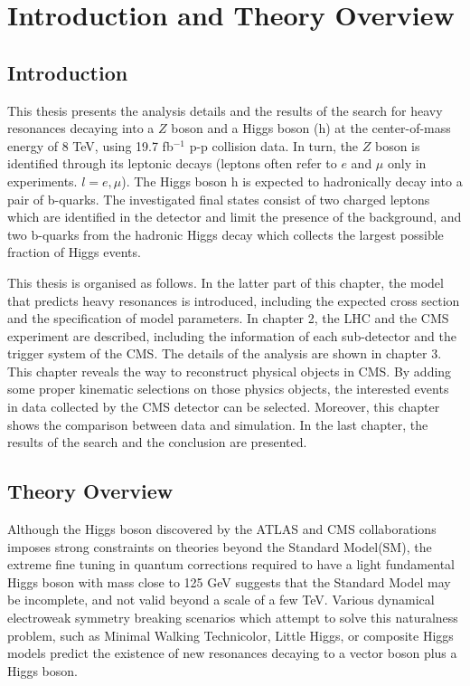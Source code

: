 \chapter{Introduction and Theory Overview}

\section{Introduction}
This thesis presents the analysis details and the results of the search for heavy resonances decaying into a $Z$ boson and a Higgs boson (h) at the center-of-mass energy of 8 TeV, using 19.7 fb$^{-1}$ p-p collision data. In turn, the $Z$ boson is identified through its leptonic decays (leptons often refer to $e$ and $\mu$ only in experiments. $l = e, \mu$). The Higgs boson h is expected to hadronically decay into a pair of b-quarks. The investigated final states consist of two charged leptons which are identified in the detector and limit the presence of the background, and two b-quarks from the hadronic Higgs decay which collects the largest possible fraction of Higgs events.

This thesis is organised as follows. In the latter part of this chapter, the model that predicts heavy resonances is introduced, including the expected cross section and the specification of model parameters. In chapter 2, the LHC and the CMS experiment are described, including the information of each sub-detector and the trigger system of the CMS. The details of the analysis are shown in chapter 3. This chapter reveals the way to reconstruct physical objects in CMS. By adding some proper kinematic selections on those physics objects, the interested events in data collected by the CMS detector can be selected. Moreover, this chapter shows the comparison between data and simulation. In the last chapter, the results of the search and the conclusion are presented.

\section{Theory Overview}
Although the Higgs boson discovered by the ATLAS and CMS collaborations\cite{atlas-higgs-1,cms-higgs-1,cms-higgs-2} imposes strong constraints on theories beyond the Standard Model(SM), the extreme fine tuning in quantum corrections required to have a light fundamental Higgs boson with mass close to 125 GeV\cite{cms-higgs-3,atlas-higgs-2,atlas-higgs-3,atlas-cms-higgs} suggests that the Standard Model may be incomplete, and not valid beyond a scale of a few TeV. Various dynamical electroweak symmetry breaking scenarios which attempt to solve this naturalness problem, such as Minimal Walking Technicolor\cite{technicolor}, Little Higgs\cite{little-higgs-1,little-higgs-2,little-higgs-3}, or composite Higgs models\cite{compositehiggs-1,compositehiggs-2,compositehiggs-3} predict the existence of new resonances decaying to a vector boson plus a Higgs boson.

